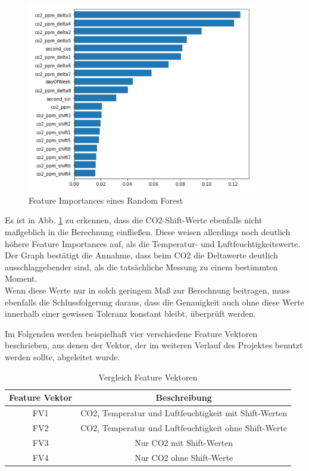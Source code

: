 \begin{figure}[h]
    \centering
    \includegraphics[width=0.9\textwidth]{pic/feature_importances_better.png}
    \caption{Feature Importances eines Random Forest}
    \label{fig:FIB}
\end{figure}

Es ist in Abb. \ref{fig:FIB} zu erkennen, dass die CO2-Shift-Werte ebenfalls nicht maßgeblich in die Berechnung einfließen. Diese weisen
allerdings noch deutlich höhere Feature Importances auf, als die Temperatur- und Luftfeuchtigkeitswerte.\\
Der Graph bestätigt die Annahme, dass beim CO2 die Deltawerte deutlich ausschlaggebender sind, als die 
tatsächliche Messung zu einem bestimmten Moment. \\

\newpage
Wenn diese Werte nur in solch geringem Maß zur Berechnung beitragen, muss ebenfalls die Schlussfolgerung daraus, 
dass die Genauigkeit auch ohne diese Werte innerhalb einer gewissen Toleranz konstant bleibt, überprüft werden.

Im Folgenden werden beispielhaft vier verschiedene Feature Vektoren beschrieben, aus denen der Vektor, der im 
weiteren Verlauf des Projektes benutzt werden sollte, abgeleitet wurde.
\begin{center}
    \begin{table}[h]
        \centering
        \caption{Vergleich Feature Vektoren}
        \begin{tabular}{ |c||c| } 
        \hline
        Feature Vektor & Beschreibung \\ 
        \hline\hline
        FV1 & CO2, Temperatur und Luftfeuchtigkeit mit Shift-Werten\\ 
        FV2 & CO2, Temperatur und Luftfeuchtigkeit ohne Shift-Werte \\ 
        FV3 & Nur CO2 mit Shift-Werten\\ 
        FV4 & Nur CO2 ohne Shift-Werte \\
        \hline
        \end{tabular}
    \end{table}
\end{center}

